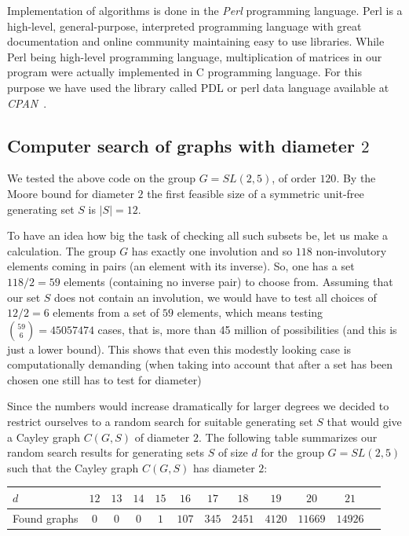 \documentclass[a4paper,12pt,oneside]{report}%
\begin{document}


Implementation of algorithms is done in the {\em Perl} programming language. Perl is a high-level, general-purpose, interpreted programming language with great documentation and online community maintaining easy to use libraries. While Perl being high-level programming language, multiplication of matrices in our program were actually implemented in C programming language. For this purpose we have used the library called PDL or perl data language available at {\em CPAN}~\cite{CPAN}.

\subsection{Computer search of graphs with diameter $2$}

We tested the above code on the group $G=SL(2,5)$, of order $120$. By the Moore bound for diameter $2$ the first feasible size of a symmetric unit-free generating set $S$ is $|S|=12$.

To have an idea how big the task of checking all such subsets be, let us make a calculation. The group $G$ has exactly one involution and so $118$ non-involutory elements coming in pairs (an element with its inverse). So, one has a set $118/2=59$ elements (containing no inverse pair) to choose from. Assuming that our set $S$ does not contain an involution, we would have to test all choices of $12/2=6$ elements from a set of $59$ elements, which means testing ${59 \choose 6} = 45057474 $ cases, that is, more than 45 million of possibilities (and this is just a lower bound). This shows that even this modestly looking case is computationally demanding (when taking into account that after a set has been chosen one still has to test for diameter)

Since the numbers would increase dramatically for larger degrees we decided to restrict ourselves to a random search for suitable generating set $S$ that would give     a Cayley graph $C(G,S)$ of diameter $2$. The following table summarizes our random search results for generating sets $S$ of size $d$ for the group $G=SL(2,5)$ such     that the Cayley graph $C(G,S)$ has diameter $2$: ~ \\

\begin{tabular}[htbp]{l*{10}{c}r}
     $d$ & $12$ & $13$ & $14$ & $15$ & $16$ & $17$ & $18$ & $19$ & $20$ & $21$ \\
\hline
     Found graphs & $0$ & $0$  & $0$ & $1$ & $107$ & $345$ & $2451$  & $4120$ & $11669$ & $14926$ \\
\end{tabular} \\ \\
\end{document}
